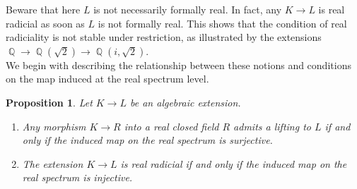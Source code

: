 \documentclass[12pt]{amsart}
\newtheorem{prop}[thm]{Proposition}
\theoremstyle{definition}
\DeclareMathOperator{\QQ}{\mathbb Q}
\begin{document}
Beware that here $L$ is not necessarily formally real. In fact, any $K\to L$ is real radicial as soon as $L$ is not formally real. This shows  that the condition of real radiciality is not stable under restriction, as illustrated by the extensions $\QQ\to \QQ(\sqrt{2})
\to \QQ(i,\sqrt{2})$. \\




 We begin with describing the relationship between these notions and conditions on the map induced at the real spectrum level. 

\begin{prop}\label{LiftSpecrBij} Let $K\to L$ be an algebraic extension. 
\begin{enumerate}
\item Any morphism $K\to R$ into a real closed field $R$ admits a lifting to $L$  if and only if 	the induced map on the real spectrum is surjective.
\item The extension $K\to L$ is real radicial 
 if and only if 	the induced map on the real spectrum is injective.
\end{enumerate} 
\end{prop}
\end{document}

